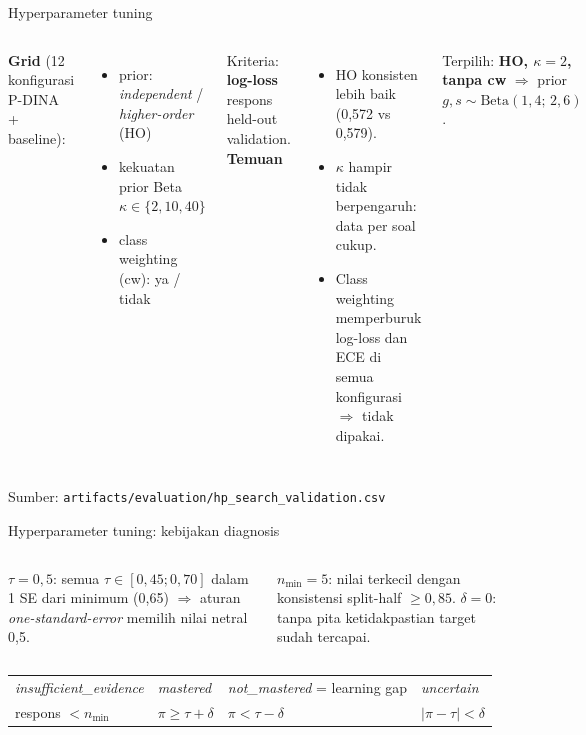 \documentclass[aspectratio=169,10pt]{beamer}
\newcommand{\src}[1]{\par\vfill{\tiny\color{midgray}Sumber: #1}}
\begin{document}
\begin{frame}{Hyperparameter tuning}
  \begin{columns}[T]
    \setlength\figH{6.2cm}
    
    \footnotesize
    \textbf{Grid} (12 konfigurasi P-DINA + baseline):
    \begin{itemize}
      \item prior: \emph{independent} / \emph{higher-order} (HO)
      \item kekuatan prior Beta $\kappa\in\{2, 10, 40\}$
      \item class weighting (cw): ya / tidak
    \end{itemize}
    Kriteria: \textbf{log-loss} respons held-out validation.\\[4pt]
    \textbf{Temuan}
    \begin{itemize}
      \item HO konsisten lebih baik (0,572 vs 0,579).
      \item $\kappa$ hampir tidak berpengaruh: data per soal cukup.
      \item Class weighting memperburuk log-loss dan ECE di semua konfigurasi $\Rightarrow$ tidak dipakai.
    \end{itemize}
    \begin{infobox}
      Terpilih: \textbf{HO, $\kappa=2$, tanpa cw} $\Rightarrow$ prior $g,s\sim\mathrm{Beta}(1{,}4;\,2{,}6)$.
    \end{infobox}
  \end{columns}
  \src{\texttt{artifacts/evaluation/hp\_search\_validation.csv}}
\end{frame}

\begin{frame}{Hyperparameter tuning: kebijakan diagnosis}
  \begin{columns}[T]
    \setlength\figH{4.1cm}
    
    \footnotesize
    \textbf{$\tau = 0{,}5$}: semua $\tau\in[0{,}45;0{,}70]$ dalam 1 SE dari minimum (0,65) $\Rightarrow$ aturan
    \emph{one-standard-error} memilih nilai netral 0,5.
    \setlength\figH{4.1cm}
    
    \footnotesize
    \textbf{$n_{\min}=5$}: nilai terkecil dengan konsistensi split-half $\ge0{,}85$. \textbf{$\delta=0$}: tanpa pita
    ketidakpastian target sudah tercapai.
  \end{columns}
  \vspace{0.3em}
  \footnotesize
  \centering
  \begin{tabular}{@{}llll@{}}
    \toprule
    \emph{insufficient\_evidence} & \emph{mastered} & \emph{not\_mastered} = learning gap & \emph{uncertain} \\
    respons $<n_{\min}$ & $\pi\ge\tau+\delta$ & $\pi<\tau-\delta$ & $|\pi-\tau|<\delta$ \\
    \bottomrule
  \end{tabular}
\end{frame}
\end{document}
